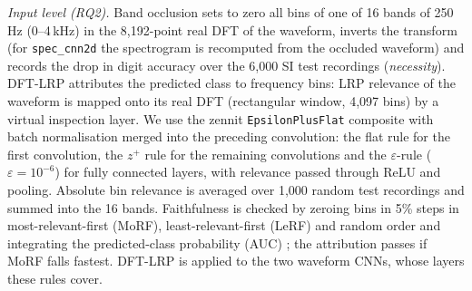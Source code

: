 \documentclass[conference]{IEEEtran}
\begin{document}
\emph{Input level (RQ2).} Band occlusion sets to zero all bins of one of 16
bands of 250\,Hz (0--4\,kHz) in the 8{,}192-point real DFT of the waveform,
inverts the transform (for \texttt{spec\_cnn2d} the spectrogram is
recomputed from the occluded waveform) and records the drop in digit accuracy
over the 6{,}000 SI test recordings (\emph{necessity}). DFT-LRP
\cite{vielhaben2024virtual} attributes the predicted class to frequency bins:
LRP relevance of the waveform is mapped onto its real DFT (rectangular window,
4{,}097 bins) by a virtual inspection layer. We use the zennit
\texttt{EpsilonPlusFlat} composite with batch normalisation merged into the
preceding convolution: the flat rule for the first convolution, the
$z^{+}$ rule for the remaining convolutions and the $\varepsilon$-rule
($\varepsilon=10^{-6}$) for fully connected layers, with relevance passed
through ReLU and pooling. Absolute bin relevance is averaged over 1{,}000
random test recordings and summed into the 16 bands. Faithfulness is checked
by zeroing bins in 5\% steps in most-relevant-first (MoRF),
least-relevant-first (LeRF) and random order and integrating the
predicted-class probability (AUC) \cite{samek2017evaluating}; the attribution
passes if MoRF falls fastest. DFT-LRP is applied to the two waveform CNNs,
whose layers these rules cover.
\end{document}
